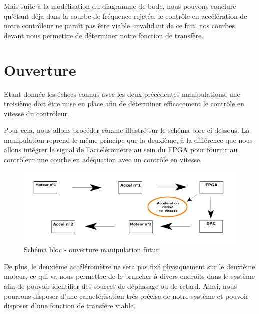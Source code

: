 \documentclass[french,a4paper,12pt]{report}
\begin{document}
			Mais suite à la modélisation du diagramme de bode, nous pouvons conclure qu'étant déja dans la courbe de fréquence rejetée, le contrôle en accélération de notre contrôleur ne paraît pas être viable, invalidant de ce fait, nos courbes devant nous permettre de déterminer notre fonction de transfère.
			
\newpage
			
		\section{Ouverture}
	
		Etant donnée les échecs connus avec les deux précédentes manipulations, une troisième doit être mise en place afin de déterminer efficacement le contrôle en vitesse du contrôleur.
		
		Pour cela, nous allons procéder comme illustré sur le schéma bloc ci-dessous. La manipulation reprend le même principe que la deuxième, à la différence que nous allons intégrer le signal de l'accéléromètre au sein du FPGA pour fournir au contrôleur une courbe en adéquation avec un contrôle en vitesse.
		
	\begin{figure}[!ht]
    \center
  	\includegraphics[width=18cm]{manip3.png}
    \caption{Schéma bloc - ouverture manipulation futur}
	\end{figure}
	
	De  plus, le deuxième accéléromètre ne sera pas fixé physiquement sur le deuxième moteur, ce qui va nous permettre de le brancher à divers endroits dans le système afin de pouvoir identifier des sources de déphasage ou de retard. Ainsi, nous pourrons disposer d'une caractérisation très précise de notre système et pouvoir disposer d'une fonction de transfère viable.
	
	
	


	
	
	
	
	
	
\end{document}
